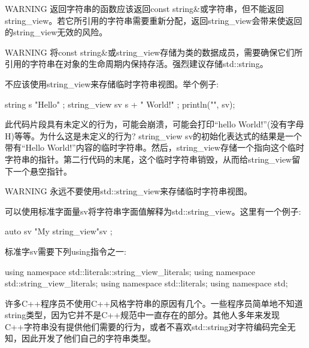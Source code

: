 \begin{myWarning}{WARNING}
返回字符串的函数应该返回const string\&或字符串，但不能返回string\_view。若它所引用的字符串需要重新分配，返回string\_view会带来使返回的string\_view无效的风险。
\end{myWarning}

\begin{myWarning}{WARNING}
将const string\&或string\_view存储为类的数据成员，需要确保它们所引用的字符串在对象的生命周期内保持存活。强烈建议存储std::string。
\end{myWarning}


不应该使用string\_view来存储临时字符串视图。举个例子:

\begin{cpp}
string s { "Hello" };
string_view sv { s + " World!" };
println("{}", sv);
\end{cpp}

此代码片段具有未定义的行为，可能会崩溃，可能会打印“hello World!”(没有字母H)等等。为什么这是未定义的行为? string\_view sv的初始化表达式的结果是一个带有“Hello World!”内容的临时字符串。然后，string\_view存储一个指向这个临时字符串的指针。第二行代码的末尾，这个临时字符串销毁，从而给string\_view留下一个悬空指针。

\begin{myWarning}{WARNING}
永远不要使用std::string\_view来存储临时字符串视图。
\end{myWarning}


可以使用标准字面量sv将字符串字面值解释为std::string\_view。这里有一个例子:

\begin{cpp}
auto sv { "My string_view"sv };
\end{cpp}

标准字sv需要下列using指令之一:

\begin{cpp}
using namespace std::literals::string_view_literals;
using namespace std::string_view_literals;
using namespace std::literals;
using namespace std;
\end{cpp}


许多C++程序员不使用C++风格字符串的原因有几个。一些程序员简单地不知道string类型，因为它并不是C++规范中一直存在的部分。其他人多年来发现C++字符串没有提供他们需要的行为，或者不喜欢std::string对字符编码完全无知，因此开发了他们自己的字符串类型。

